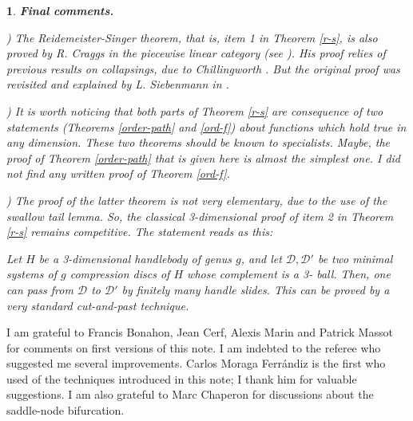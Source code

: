 \documentclass[12pt]{amsart}
\newtheorem{rien}[thm]{}
\def\nd{\noindent}
\begin{document}
\vskip 1cm
\begin{rien} {\bf Final comments.}{\rm

\nd 1) The Reidemeister-Singer theorem, that is, item 1 in Theorem \ref{r-s}, is also proved by 
 R. Craggs  in the piecewise linear category (see \cite{craggs}). His proof relies of previous results on collapsings, due to Chillingworth \cite{chilling}. But the original proof was revisited and explained by 
 L. Siebenmann in \cite{siebenmann}.





\nd 2) It is worth noticing that both parts of Theorem \ref{r-s} are consequence of two statements
(Theorems \ref{order-path} and \ref{ord-f})
about functions which hold true in any dimension. %
These two theorems should be known to specialists. Maybe, the proof of Theorem \ref{order-path} that is given here
is almost the simplest one.   I did not find any written proof of Theorem \ref{ord-f}.


\nd 3) The  proof of the latter theorem is not very elementary, due to the use
  of the swallow tail 
lemma. %
So,  the classical 3-dimensional proof of item 2 in Theorem \ref{r-s} remains competitive. The statement reads as this:} Let $H$ be a 3-dimensional handlebody of genus $g$, and let
$\mathcal D, \mathcal D'$ be two  minimal systems of $g$ compression discs of $H$ whose complement
 is a 3- ball.
 Then, one can pass  from $\mathcal D$ to $\mathcal D'$ by finitely many
handle slides. {\rm This can be proved by a very standard} cut-and-past {\rm technique}.
\end{rien}

I am grateful to Francis Bonahon,  Jean Cerf, Alexis Marin and Patrick Massot 
for comments on  first versions of this note. I am indebted to the referee who suggested me 
several improvements. Carlos Moraga Ferr\'andiz \cite{carlos} is the first who  used of the techniques introduced in this note; I thank him for valuable suggestions. I am also grateful to Marc Chaperon for 
discussions about the saddle-node bifurcation.\\
\end{document}
